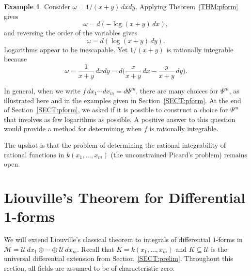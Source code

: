 \documentclass{amsart}
\theoremstyle{definition}
\newtheorem{example}[thm]{Example}
\numberwithin{equation}{section}
\numberwithin{thm}{section}
\begin{document}
\begin{example}\label{EXAM:ratint}
Consider $\omega = 1/(x+y)\,dxdy$.  Applying Theorem~\ref{THM:pform} gives
\[
\omega = d({-}\log(x+y)\,dx),
\]
and reversing the order of the variables gives
\[
\omega = d(\log(x+y)\,dy).
\]
Logarithms appear to be inescapable.  Yet $1/(x+y)$ is rationally integrable because
\[
 \omega =  \frac{1}{x+y} \, dxdy = d \Big(\frac{x}{x+y} \, dx - \frac{y}{x+y} \, dy\Big).
 \]
\end{example}

In general, when we write $f \,dx_1\cdots dx_m = d\Psi^m$, there are many choices for $\Psi^m$, as illustrated here and in the examples given in Section~\ref{SECT:pform}.  At the end of Section~\ref{SECT:pform}, we asked if it is possible to construct a choice for $\Psi^m$ that involves as few logarithms as possible.  A positive answer to this question would provide a method for determining when $f$ is rationally integrable.



The upshot is that the problem of determining the rational integrability of rational functions in $k(x_1,\dots,x_m)$ (the unconstrained Picard's problem) remains open.


\section{Liouville's Theorem for Differential 1-forms }
\label{SECT:Liouville}

We will extend Liouville's classical theorem to
integrals of differential $1$-forms in~$\mathcal{M} = \mathcal{U}\,dx_1\oplus\cdots\oplus \mathcal{U}\,dx_m$. Recall that $K = k(x_1,\ldots,x_m)$ and $K \subseteq  \mathcal{U}$ is the universal differential extension from Section~\ref{SECT:prelim}. Throughout this section, all fields are assumed to be of characteristic zero.
\end{document}
